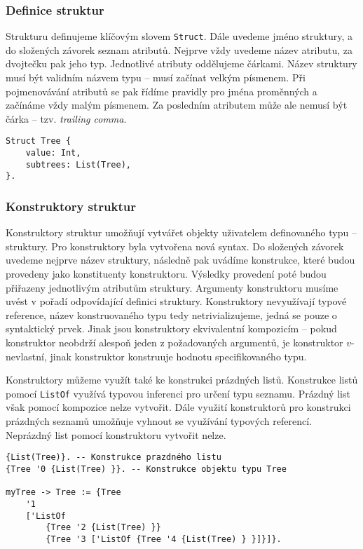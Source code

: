\subsubsection{Definice struktur}

Strukturu definujeme klíčovým slovem \lstinline{Struct}. Dále uvedeme jméno struktury, a do
složených závorek seznam atributů. Nejprve vždy uvedeme název atributu, za dvojtečku pak jeho typ.
Jednotlivé atributy oddělujeme čárkami. Název struktury musí být validním názvem typu -- musí
začínat velkým písmenem. Při pojmenovávání atributů se pak řídíme pravidly pro jména proměnných
a začínáme vždy malým písmenem. Za posledním atributem může ale nemusí být čárka -- tzv.
\textit{trailing comma}.

\begin{lstlisting}[caption={Příklad definice struktury}]
Struct Tree {
    value: Int,
    subtrees: List(Tree),
}.
\end{lstlisting}

\subsubsection{Konstruktory struktur}

Konstruktory struktur umožňují vytvářet objekty uživatelem definovaného typu -- struktury.
Pro konstruktory byla vytvořena nová syntax. Do složených závorek uvedeme nejprve název struktury,
následně pak uvádíme konstrukce, které budou provedeny jako konstituenty konstruktoru. Výsledky
provedení poté budou přiřazeny jednotlivým atributům struktury. Argumenty konstruktoru musíme uvést
v pořadí odpovídající definici struktury. Konstruktory nevyužívají typové reference, název
konstruovaného typu tedy netrivializujeme, jedná se pouze o syntaktický prvek. Jinak jsou
konstruktory ekvivalentní kompozicím -- pokud konstruktor neobdrží alespoň jeden z požadovaných
argumentů, je konstruktor $v$-nevlastní, jinak konstruktor konstruuje hodnotu specifikovaného typu.

Konstruktory můžeme využít také ke konstrukci prázdných listů. Konstrukce listů pomocí
\lstinline{ListOf} využívá typovou inferenci pro určení typu seznamu. Prázdný list však pomocí
kompozice nelze vytvořit. Dále využití konstruktorů pro konstrukci prázdných seznamů umožňuje
vyhnout se využívání typových referencí. Neprázdný list pomocí konstruktoru vytvořit nelze.

\begin{lstlisting}[caption={Příklad definice struktury}]
{List(Tree)}. -- Konstrukce prazdného listu
{Tree '0 {List(Tree) }}. -- Konstrukce objektu typu Tree

myTree -> Tree := {Tree
    '1
    ['ListOf 
        {Tree '2 {List(Tree) }}
        {Tree '3 ['ListOf {Tree '4 {List(Tree) } }]}]}.
\end{lstlisting}

